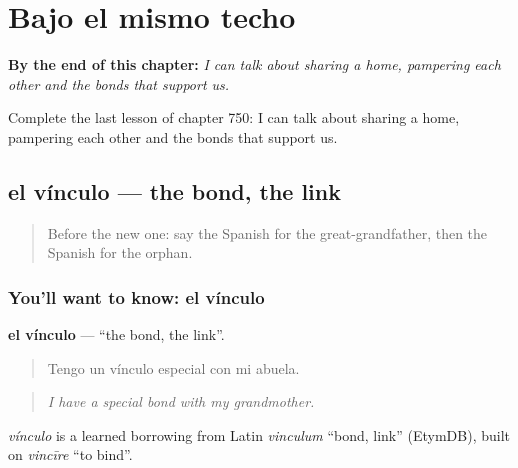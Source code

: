 
\chapter{Bajo el mismo techo}
\label{ch:es-bajo-el-mismo-techo}

\begin{chapteropening}
\textbf{By the end of this chapter:} \emph{I can talk about sharing a home, pampering each other and the bonds that support us.}

Complete the last lesson of chapter 750: I can talk about sharing a home, pampering each other and the bonds that support us.
\end{chapteropening}

\section[el vínculo]{el vínculo — the bond, the link}

\label{lesson:ES-C750-vinculo}



\begin{quote}
Before the new one: say the Spanish for the great-grandfather, then the Spanish for the orphan.
\end{quote}

\subsection*{You'll want to know: el vínculo}
\textbf{el vínculo} — \textquotedblleft{}the bond, the link\textquotedblright{}.

\begin{quote}
Tengo un vínculo especial con mi abuela.
\end{quote}

\begin{quote}
\emph{I have a special bond with my grandmother.}
\end{quote}

\begin{cousinweb}
\emph{vínculo} is a learned borrowing from Latin \emph{vinculum} \textquotedblleft{}bond, link\textquotedblright{} (EtymDB), built on \emph{vincīre} \textquotedblleft{}to bind\textquotedblright{}.
\end{cousinweb}

